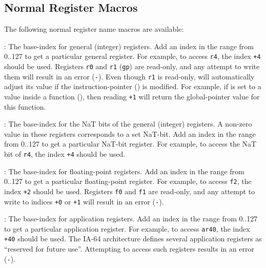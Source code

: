 \documentclass{article}
\begin{document}
\subsection{Normal Register Macros}

The following normal register name macros are available:
\begin{Description}
\item[\Const{UNW\_IA64\_GR}:] The base-index for general (integer)
  registers.  Add an index in the range from 0..127 to get a
  particular general register.  For example, to access \texttt{r4},
  the index \texttt{+4} should be used.
  Registers \texttt{r0} and \texttt{r1} (\texttt{gp}) are read-only,
  and any attempt to write them will result in an error
  (\texttt{-}).  Even though \texttt{r1} is
  read-only,  will automatically adjust its value if
  the instruction-pointer () is modified.  For
  example, if  is set to a value inside a
  function (), then reading
  \texttt{+1} will return the global-pointer
  value for this function.
\item[\Const{UNW\_IA64\_NAT}:] The base-index for the NaT bits of the
  general (integer) registers.  A non-zero value in these registers
  corresponds to a set NaT-bit.  Add an index in the range from 0..127
  to get a particular NaT-bit register.  For example, to access the
  NaT bit of \texttt{r4}, the index \texttt{+4}
  should be used.
\item[\Const{UNW\_IA64\_FR}:] The base-index for floating-point
  registers.  Add an index in the range from 0..127 to get a
  particular floating-point register.  For example, to access
  \texttt{f2}, the index \texttt{+2} should be
  used.  Registers \texttt{f0} and \texttt{f1} are read-only, and any
  attempt to write to indices \texttt{+0} or
  \texttt{+1} will result in an error
  (\texttt{-}).
\item[\Const{UNW\_IA64\_AR}:] The base-index for application
  registers.  Add an index in the range from 0..127 to get a
  particular application register.  For example, to access
  \texttt{ar40}, the index \texttt{+40} should be
  used.  The IA-64 architecture defines several application registers
  as ``reserved for future use''.  Attempting to access such registers
  results in an error (\texttt{-}).

\end{Description}
\end{document}
